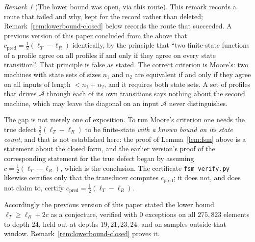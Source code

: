 \documentclass[11pt]{article}
\theoremstyle{plain}
\theoremstyle{definition}
\theoremstyle{remark}
\newtheorem{remark}[theorem]{Remark}
\begin{document}
\begin{remark}[The lower bound was open, via this route]
\label{rem:lowerbound-open}
This remark records a route that failed and why, kept for the record rather
than deleted; Remark~\ref{rem:lowerbound-closed} below records the route that
succeeded. A previous version of this paper concluded from the above that
$c_{\mathrm{pred}}=\tfrac12(\ell_T-\ell_R)$ identically, by the principle that
``two finite-state functions of a profile agree on all profiles if and only if
they agree on every state transition''. That principle is false as stated. The
correct criterion is Moore's: two machines with state sets of sizes $n_1$ and
$n_2$ are equivalent if and only if they agree on all inputs of length
$<n_1+n_2$, and it requires both state sets. A set of profiles that drives
$\mathcal{A}$ through each of its own transitions says nothing about the second
machine, which may leave the diagonal on an input $\mathcal{A}$ never
distinguishes.

The gap is not merely one of exposition. To run Moore's criterion one needs the
true defect $\tfrac12(\ell_T-\ell_R)$ to be finite-state \emph{with a known
bound on its state count}, and that is not established here: the proof of
Lemma~\ref{lem:fsm} above is a statement about the closed form, and the earlier
version's proof of the corresponding statement for the true defect began by
assuming $c=\tfrac12(\ell_T-\ell_R)$, which is the conclusion. The certificate
\texttt{fsm\_verify.py} likewise certifies only that the transducer computes
$c_{\mathrm{pred}}$; it does not, and does not claim to, certify
$c_{\mathrm{pred}}=\tfrac12(\ell_T-\ell_R)$.

Accordingly the previous version of this paper stated the lower bound
$\ell_T\ge\ell_R+2c$ as a conjecture, verified with $0$ exceptions on all
$275{,}823$ elements to depth $24$, held out at depths $19,21,23,24$, and on
samples outside that window. Remark~\ref{rem:lowerbound-closed} proves it.
\end{remark}
\end{document}
